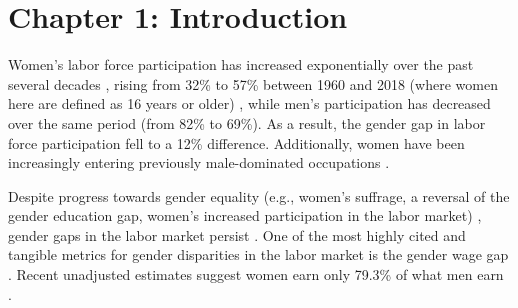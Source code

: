 \documentclass[letterpaper, nobind]{templates/ociamthesis}
\begin{document}
\begin{romanpages}
  \dominitoc %

\flushbottom

\tableofcontents

\listoftables
  \mtcaddchapter


\listoffigures
	\mtcaddchapter


\end{romanpages}

\flushbottom

\hypertarget{chapter-1-introduction}{%
\chapter{Chapter 1: Introduction}\label{chapter-1-introduction}}

\adjustmtc
{}

Women's labor force participation has increased exponentially over the past several decades \autocite{Goldin2006a,Statistics2020}, rising from 32\% to 57\% between 1960 and 2018 (where women here are defined as 16 years or older) \autocite{Statistics2020,Blau2017,Eagly2019}, while men's participation has decreased over the same period (from 82\% to 69\%). As a result, the gender gap in labor force participation fell to a 12\% difference. Additionally, women have been increasingly entering previously male-dominated occupations \autocite{Blau2013,Reskin2009,England2010}.

Despite progress towards gender equality (e.g., women's suffrage, a reversal of the gender education gap, women's increased participation in the labor market) \autocite{Goldin2014,Goldin2006a,Goldin2006,Blau2010,Blau2013,Blau2014,Bianchi2012,Sayer2005}, gender gaps in the labor market persist \autocite{Blau2017,Goldin2014,Hegewisch2014,Bertrand2001,Blau2014,Levanon2016,Blau2006b,Blau2006a}. One of the most highly cited and tangible metrics for gender disparities in the labor market is the gender wage gap \autocite{Blau2000,Blau2017,Nyhus2012,McGee2015,Goldin2014,Hegewisch2014,Bertrand2001,Blau2006b}. Recent unadjusted estimates suggest women earn only 79.3\% of what men earn \autocite{Blau2017}.
\end{document}
